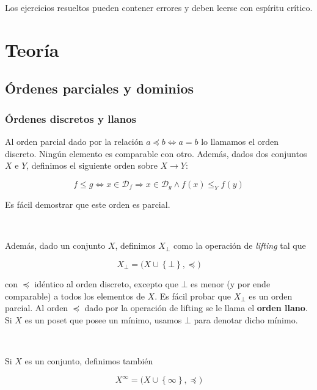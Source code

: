 \documentclass[article, 12pt]{article}
\begin{document}
Los ejercicios resueltos pueden contener errores y deben leerse con espíritu
crítico.

\newpage

\section{Teoría}

\subsection{Órdenes parciales y dominios}

\subsubsection{Órdenes discretos y llanos}

Al orden parcial dado por la relación $a \preceq b \iff a = b$ lo llamamos el
orden discreto. Ningún elemento es comparable con otro. Además, dados dos
conjuntos $X$ e $Y$, definimos el
siguiente orden sobre $X \to Y$:

\begin{equation*}
  f \leq g \iff x \in \mathcal{D}_f \Rightarrow x \in \mathcal{D}_g \land
  f(x) \leq_Y f(y)
\end{equation*}

Es fácil demostrar que este orden es parcial. 

~ 

Además, dado un conjunto $X$, definimos $X_\bot $ como la operación de
\textit{lifting} tal que 

\begin{equation*}
  X_\bot = \Big( X \cup \left\{ \bot  \right\}, \preceq  \Big)
\end{equation*}

con $\preceq$ idéntico al orden discreto, excepto que $\bot$ es menor (y por
ende comparable) a todos los elementos de $X$. Es fácil probar que $X_\bot $ es
un orden parcial. Al orden $\preceq$ dado por la operación de lifting se le
llama el \textbf{orden llano}. Si $X$ es un poset que posee un mínimo, usamos
$\bot $ para denotar dicho mínimo.

~ 

Si $X$ es un conjunto, definimos también 

\begin{equation*}
  X^\infty = \Big( X \cup \left\{ \infty \right\}, \preceq \Big)
\end{equation*}
\end{document}
